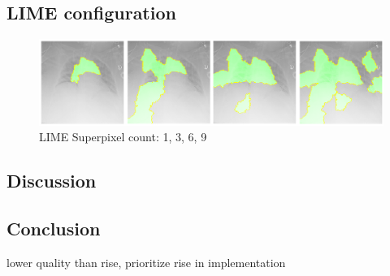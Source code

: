 \subsection{LIME configuration}

\begin{figure}[!htb]
\centering
\caption{LIME Superpixel count: 1, 3, 6, 9}
\includegraphics[width=14cm]{chapters/03_classification/images/lime-superpixel.png}
\end{figure}

\subsection{Discussion}


\subsection{Conclusion}
lower quality than rise, prioritize rise in implementation